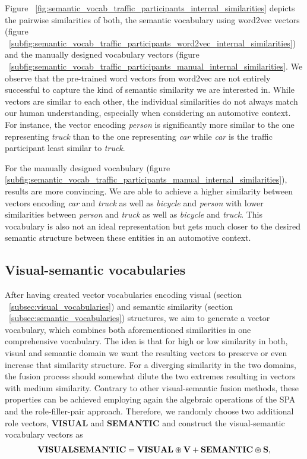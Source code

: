 Figure ~\ref{fig:semantic_vocab_traffic_participants_internal_similarities} depicts the pairwise similarities of both, the semantic vocabulary using word2vec vectors (figure ~\ref{subfig:semantic_vocab_traffic_participants_word2vec_internal_similarities}) and the manually designed vocabulary vectors (figure ~\ref{subfig:semantic_vocab_traffic_participants_manual_internal_similarities}.
We observe that the pre-trained word vectors from word2vec are not entirely successful to capture the kind of semantic similarity we are interested in.
While vectors are similar to each other, the individual similarities do not always match our human understanding, especially when considering an automotive context.
For instance, the vector encoding \emph{person} is significantly more similar to the one representing \emph{truck} than to the one representing \emph{car} while \emph{car} is the traffic participant least similar to \emph{truck}. 

For the manually designed vocabulary (figure \ref{subfig:semantic_vocab_traffic_participants_manual_internal_similarities}), results are more convincing.
We are able to achieve a higher similarity between vectors encoding \emph{car} and \emph{truck} as well as \emph{bicycle} and \emph{person} with lower similarities between \emph{person} and \emph{truck} as well as \emph{bicycle} and \emph{truck}.
This vocabulary is also not an ideal representation but gets much closer to the desired semantic structure between these entities in an automotive context. 

\subsection{Visual-semantic vocabularies}%
\label{subsec:visual_semantic_vocabularies}
 
After having created vector vocabularies encoding visual (section ~\ref{subsec:visual_vocabularies}) and semantic similarity (section ~\ref{subsec:semantic_vocabularies}) structures, we aim to generate a vector vocabulary, which combines both aforementioned similarities in one comprehensive vocabulary.
The idea is that for high or low similarity in both, visual and semantic domain we want the resulting vectors to preserve or even increase that similarity structure.
For a diverging similarity in the two domains, the fusion process should somewhat dilute the two extremes resulting in vectors with medium similarity.
Contrary to other visual-semantic fusion methods, these properties can be achieved employing again the algebraic operations of the \ac{SPA} and the role-filler-pair approach.
Therefore, we randomly choose two additional role vectors, \textbf{VISUAL} and \textbf{SEMANTIC} and construct the visual-semantic vocabulary vectors as
\begin{equation}
\label{eq:visual_semantic_vocab}
\mathbf{VISUALSEMANTIC} = \mathbf{VISUAL} \varoast \mathbf{V} + \mathbf{SEMANTIC} \varoast \mathbf{S},
\end{equation}

